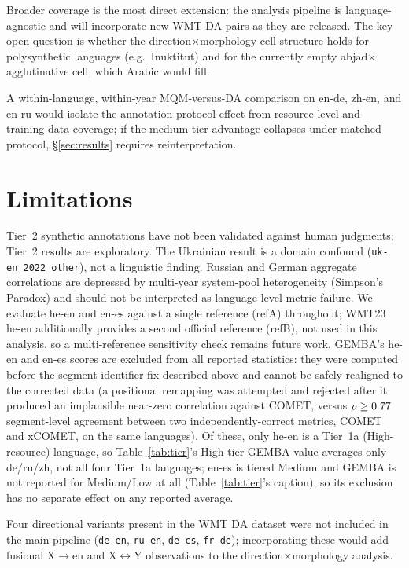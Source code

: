 \documentclass[11pt]{article}
\begin{document}
Broader coverage is the most direct extension: the analysis pipeline is language-agnostic and will incorporate new WMT DA pairs as they are released. The key open question is whether the direction$\times$morphology cell structure holds for polysynthetic languages (e.g.\ Inuktitut) and for the currently empty abjad$\times$agglutinative cell, which Arabic would fill.

A within-language, within-year MQM-versus-DA comparison on en-de, zh-en, and en-ru would isolate the annotation-protocol effect from resource level and training-data coverage; if the medium-tier advantage collapses under matched protocol, \S\ref{sec:results} requires reinterpretation.

\section*{Limitations}
\label{sec:limitations}

Tier~2 synthetic annotations have not been validated against human judgments; Tier~2 results are exploratory. The Ukrainian result is a domain confound (\texttt{uk-en\_2022\_other}), not a linguistic finding. Russian and German aggregate correlations are depressed by multi-year system-pool heterogeneity (Simpson's Paradox) and should not be interpreted as language-level metric failure. We evaluate he-en and en-es against a single reference (refA) throughout; WMT23 he-en additionally provides a second official reference (refB), not used in this analysis, so a multi-reference sensitivity check remains future work. GEMBA's he-en and en-es scores are excluded from all reported statistics: they were computed before the segment-identifier fix described above and cannot be safely realigned to the corrected data (a positional remapping was attempted and rejected after it produced an implausible near-zero correlation against COMET, versus $\rho\geq0.77$ segment-level agreement between two independently-correct metrics, COMET and xCOMET, on the same languages). Of these, only he-en is a Tier~1a (High-resource) language, so Table~\ref{tab:tier}'s High-tier GEMBA value averages only de/ru/zh, not all four Tier~1a languages; en-es is tiered Medium and GEMBA is not reported for Medium/Low at all (Table~\ref{tab:tier}'s caption), so its exclusion has no separate effect on any reported average.

Four directional variants present in the WMT DA dataset were not included in the main pipeline (\texttt{de-en}, \texttt{ru-en}, \texttt{de-cs}, \texttt{fr-de}); incorporating these would add fusional X$\to$en and X$\leftrightarrow$Y observations to the direction$\times$morphology analysis.
\end{document}
